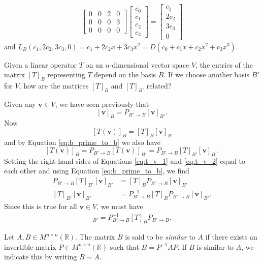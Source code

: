 \documentclass[12pt,letterpaper,reqno]{article}
\numberwithin{equation}{section}
\newcommand{\R}{\ensuremath{\mathbb R}}
\newcommand{\bv}{\mathbf{v}}
\begin{document}
\begin{example}
\begin{align*}
\begin{bmatrix}
			0 & 0 & 2 & 0 \\
			0 & 0 & 0 & 3 \\
			0 & 0 & 0 & 0
		\end{bmatrix}\begin{bmatrix}
			c_0 \\ c_1 \\ c_2 \\ c_3
		\end{bmatrix}=\begin{bmatrix}
			c_1 \\ 2c_2 \\ 3c_3 \\ 0
		\end{bmatrix}
	\end{align*}
	and $L_B(c_1,2c_2,3c_3,0)=c_1+2c_2x+3c_3x^2=D(c_0+c_1x+c_2x^2+c_3x^3)$.
\end{example}
Given a linear operator $T$ on an $n$-dimensional vector space $V$, the entries of the matrix $[T]_B$ representing $T$ depend on the basis $B$. If we choose another basis $B'$ for $V$, how are the matrices $[T]_B$ and $[T]_{B'}$ related? 

Given any $\bv \in V$, we have seen previously that 
\begin{equation}\label{eq:b_prime_to_b}
	[\bv]_B=P_{B' \to B}[\bv]_{B'}.
\end{equation}
Now 
\begin{equation}\label{eq:t_v_1}
	[T(\bv)]_B=[T]_B[\bv]_B
\end{equation}
and by Equation \eqref{eq:b_prime_to_b} we also have
\begin{equation}\label{eq:t_v_2}
	[T(\bv)]_B=P_{B' \to B}[T(\bv)]_{B'}=P_{B' \to B}[T]_{B'}[\bv]_{B'}.
\end{equation}
Setting the right hand sides of Equations \eqref{eq:t_v_1} and \eqref{eq:t_v_2} equal to each other and using Equation \eqref{eq:b_prime_to_b}, we find
\begin{align*}
	P_{B' \to B}[T]_{B'}[\bv]_{B'}&=[T]_BP_{B' \to B}[\bv]_{B'} \\
	[T]_{B'}[\bv]_{B'}&=P_{B' \to B}^{-1}[T]_BP_{B' \to B}[\bv]_{B'}.
\end{align*}
Since this is true for all $\bv \in V$, we must have
\begin{align*}
	[T]_{B'}=P^{-1}_{B' \to B}[T]_BP_{B' \to B}.
\end{align*}

\begin{defn}
Let $A,B \in M^{n \times n}(\R)$. The matrix $B$ is said to be \emph{similar} to $A$ if there exists an invertible matrix $P \in M^{n \times n}(\R)$ such that $B=P^{-1}AP$. If $B$ is similar to $A$, we indicate this by writing $B \sim A$.	
\end{defn}
\end{document}

